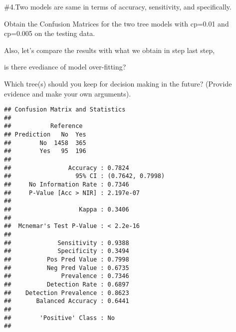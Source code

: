 \documentclass[
]{article}
\newenvironment{Shaded}{\begin{snugshade}}{\end{snugshade}}
\newcommand{\AttributeTok}[1]{\textcolor[rgb]{0.13,0.29,0.53}{#1}}
\newcommand{\FunctionTok}[1]{\textcolor[rgb]{0.13,0.29,0.53}{\textbf{#1}}}
\newcommand{\NormalTok}[1]{#1}
\newcommand{\OtherTok}[1]{\textcolor[rgb]{0.56,0.35,0.01}{#1}}
\newcommand{\SpecialCharTok}[1]{\textcolor[rgb]{0.81,0.36,0.00}{\textbf{#1}}}
\newcommand{\StringTok}[1]{\textcolor[rgb]{0.31,0.60,0.02}{#1}}
\begin{document}
\#4.Two models are same in terms of accuracy, sensitivity, and
specifically.

Obtain the Confusion Matrices for the two tree models with cp=0.01 and
cp=0.005 on the testing data.

Also, let's compare the results with what we obtain in step last step,

is there evediance of model over-fitting?

Which tree(s) should you keep for decision making in the future?
(Provide evidence and make your own arguments).

\begin{Shaded}
\end{Shaded}

\begin{verbatim}
## Confusion Matrix and Statistics
## 
##           Reference
## Prediction   No  Yes
##        No  1458  365
##        Yes   95  196
##                                           
##                Accuracy : 0.7824          
##                  95% CI : (0.7642, 0.7998)
##     No Information Rate : 0.7346          
##     P-Value [Acc > NIR] : 2.197e-07       
##                                           
##                   Kappa : 0.3406          
##                                           
##  Mcnemar's Test P-Value : < 2.2e-16       
##                                           
##             Sensitivity : 0.9388          
##             Specificity : 0.3494          
##          Pos Pred Value : 0.7998          
##          Neg Pred Value : 0.6735          
##              Prevalence : 0.7346          
##          Detection Rate : 0.6897          
##    Detection Prevalence : 0.8623          
##       Balanced Accuracy : 0.6441          
##                                           
##        'Positive' Class : No              
## 
\end{verbatim}

\begin{Shaded}
\end{Shaded}
\end{document}
